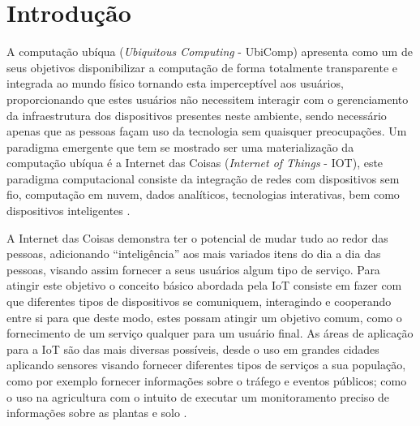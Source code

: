 \documentclass[ti,table]{texufpel} %
\begin{document}
  


\tableofcontents 

  



\chapter{Introdução} 

  

A computação ubíqua (\textit{Ubiquitous Computing} - UbiComp) apresenta como um de seus objetivos  disponibilizar a computação de forma totalmente transparente e integrada ao mundo físico tornando esta imperceptível aos usuários, proporcionando que estes usuários não necessitem interagir com o gerenciamento da infraestrutura dos dispositivos presentes neste ambiente, sendo necessário apenas que as pessoas façam uso da tecnologia sem quaisquer preocupações. Um paradigma emergente que tem se mostrado ser uma materialização da computação ubíqua é a Internet das Coisas (\textit{Internet of Things} - IOT), este paradigma computacional consiste da integração de redes com dispositivos sem fio, computação em nuvem, dados analíticos, tecnologias interativas, bem como dispositivos inteligentes \cite{weiser1999computer}.  

  

A Internet das Coisas demonstra ter o potencial de mudar tudo ao redor das pessoas, adicionando ``inteligência'' aos mais variados itens do dia a dia das pessoas, visando assim fornecer a seus usuários algum tipo de serviço. Para atingir este objetivo o conceito básico abordada pela IoT consiste em fazer com que diferentes tipos de dispositivos se comuniquem, interagindo e cooperando entre si para que deste modo, estes possam atingir um objetivo comum, como o fornecimento de um serviço qualquer para um usuário final. As áreas de aplicação para a IoT são das mais diversas possíveis, desde o uso em grandes cidades aplicando sensores visando fornecer diferentes tipos de serviços a sua população, como por exemplo fornecer informações sobre o tráfego e eventos públicos; como o uso na agricultura com o intuito de executar um monitoramento preciso de  informações sobre as plantas e solo \cite{gonccalves2017research}. 

  
\end{document}
